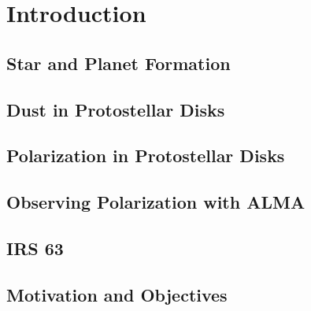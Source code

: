 \chapter{Introduction}
\label{ch_introduction}



\section{Star and Planet Formation}




\section{Dust in Protostellar Disks }



\section{Polarization in Protostellar Disks}



\section{Observing Polarization with ALMA} 



\section{IRS 63}




\section{Motivation and Objectives}



